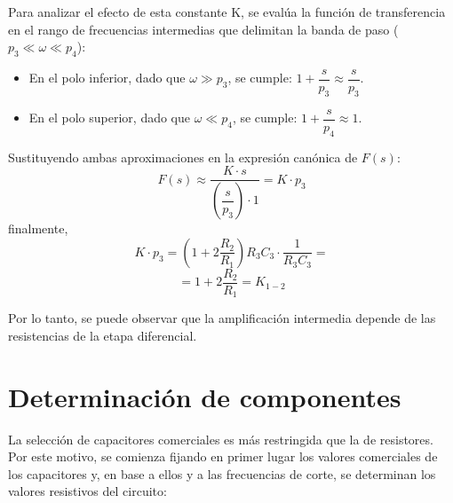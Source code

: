 Para analizar el efecto de esta constante K, se evalúa la función de
transferencia en el rango de frecuencias intermedias que delimitan la
banda de paso ($p_3 \ll \omega \ll p_4$):

\begin{itemize}
  \item En el polo inferior, dado que $\omega \gg p_3$, se cumple: $1 + \dfrac{s}{p_3} \approx \dfrac{s}{p_3}$.
  \item En el polo superior, dado que $\omega \ll p_4$, se cumple: $1 + \dfrac{s}{p_4} \approx 1$.
\end{itemize}
Sustituyendo ambas aproximaciones en la expresión canónica de $F(s)$:
\begin{equation*}
  F(s) \approx \frac{K \cdot s}{\left(\dfrac{s}{p_3}\right) \cdot 1} = K \cdot p_3
\end{equation*}
finalmente,
\begin{equation*}
  K \cdot p_3 = \left(1 + 2 \frac{R_2}{R_1}\right) R_3 C_3 \cdot \frac{1}{R_3
    C_3} =
\end{equation*}
\begin{equation}
    = 1 + 2 \frac{R_2}{R_1} = K_{1-2}
    \label{eq:k_final}
\end{equation}

Por lo tanto, se puede observar que la amplificación intermedia depende de las resistencias de
la etapa diferencial.

\section{Determinación de componentes}

La selección de capacitores comerciales es más restringida que la de resistores. Por
este motivo, se comienza fijando en primer lugar los valores comerciales de los
capacitores y, en base a ellos y a las frecuencias de corte, se determinan los
valores resistivos del circuito:

